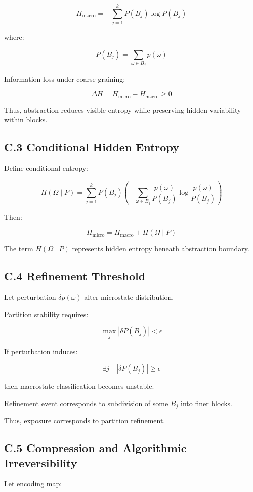 \documentclass[11pt,openany]{book}
\begin{document}
\[
H_{\text{macro}}
=
- \sum_{j=1}^{k} P(B_j)\log P(B_j)
\]

where:

\[
P(B_j) = \sum_{\omega \in B_j} p(\omega)
\]

Information loss under coarse-graining:

\[
\Delta H
=
H_{\text{micro}} - H_{\text{macro}}
\ge 0
\]

Thus, abstraction reduces visible entropy while preserving hidden variability within blocks.

\subsection{C.3 Conditional Hidden Entropy}

Define conditional entropy:

\[
H(\Omega \mid P)
=
\sum_{j=1}^{k} P(B_j)
\left(
- \sum_{\omega \in B_j}
\frac{p(\omega)}{P(B_j)}
\log
\frac{p(\omega)}{P(B_j)}
\right)
\]

Then:

\[
H_{\text{micro}}
=
H_{\text{macro}}
+
H(\Omega \mid P)
\]

The term $H(\Omega \mid P)$ represents hidden entropy beneath abstraction boundary.

\subsection{C.4 Refinement Threshold}

Let perturbation $\delta p(\omega)$ alter microstate distribution.

Partition stability requires:

\[
\max_j
\left|
\delta P(B_j)
\right|
<
\epsilon
\]

If perturbation induces:

\[
\exists j \quad
\left|
\delta P(B_j)
\right|
\ge \epsilon
\]

then macrostate classification becomes unstable.

Refinement event corresponds to subdivision of some $B_j$ into finer blocks.

Thus, exposure corresponds to partition refinement.

\subsection{C.5 Compression and Algorithmic Irreversibility}

Let encoding map:
\end{document}

